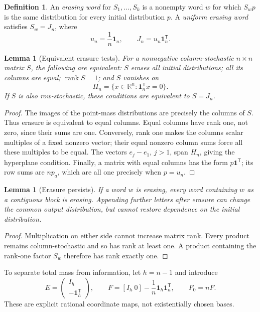 \documentclass[11pt,letterpaper]{article}
\newtheorem{lemma}[theorem]{Lemma}
\theoremstyle{definition}
\newtheorem{definition}[theorem]{Definition}
\theoremstyle{remark}
\newcommand{\R}{\mathbb R}
\newcommand{\one}{\mathbf 1}
\newcommand{\rk}{\operatorname{rank}}
\newcommand{\transpose}{^{\mathsf T}}
\begin{document}
\begin{definition}
An \emph{erasing word} for $S_1,\ldots,S_k$ is a nonempty word $w$ for which
$S_wp$ is the same distribution for every initial distribution $p$. A
\emph{uniform erasing word} satisfies $S_w=J_n$, where
\[
 u_n=\frac1n\one_n,\qquad J_n=u_n\one_n\transpose.
\]
\end{definition}

\begin{lemma}[Equivalent erasure tests]\label{ste:ee:lem:erasure}
For a nonnegative column-stochastic $n\times n$ matrix $S$, the following are
equivalent: $S$ erases all initial distributions; all its columns are equal;
$\rk S=1$; and $S$ vanishes on
\[
 H_n=\{x\in\R^n:\one_n\transpose x=0\}.
\]
If $S$ is also row-stochastic, these conditions are equivalent to $S=J_n$.
\end{lemma}
\begin{proof}
The images of the point-mass distributions are precisely the columns of $S$.
Thus erasure is equivalent to equal columns. Equal columns have rank one, not
zero, since their sums are one. Conversely, rank one makes the columns scalar
multiples of a fixed nonzero vector; their equal nonzero column sums force all
these multiples to be equal. The vectors $e_j-e_1$, $j>1$, span $H_n$, giving the
hyperplane condition. Finally, a matrix with equal columns has the form
$p\one\transpose$; its row sums are $np_a$, which are all one precisely when
$p=u_n$.
\end{proof}

\begin{lemma}[Erasure persists]\label{ste:ee:lem:persistence}
If a word $w$ is erasing, every word containing $w$ as a contiguous block is
erasing. Appending further letters after erasure can change the common output
distribution, but cannot restore dependence on the initial distribution.
\end{lemma}
\begin{proof}
Multiplication on either side cannot increase matrix rank. Every product remains
column-stochastic and so has rank at least one. A product containing the rank-one
factor $S_w$ therefore has rank exactly one.
\end{proof}

To separate total mass from information, let $h=n-1$ and introduce
\begin{equation}
 E=\begin{pmatrix}I_h\\-\one_h\transpose\end{pmatrix},\qquad
 F=[I_h\ 0]-\frac1n\one_h\one_n\transpose,\qquad F_0=nF.
 \label{ste:ee:eq:EF}
\end{equation}
These are explicit rational coordinate maps, not existentially chosen bases.
\end{document}
